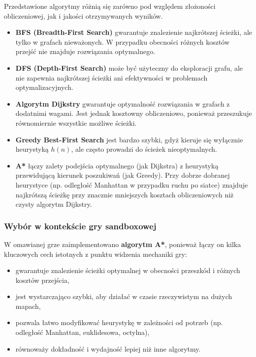\documentclass[a4paper,12pt]{book} %
\begin{document}
Przedstawione algorytmy różnią się zarówno pod względem złożoności obliczeniowej, 
jak i jakości otrzymywanych wyników. 
\begin{itemize}
    \item \textbf{BFS (Breadth-First Search)} gwarantuje znalezienie najkrótszej ścieżki, 
    ale tylko w grafach nieważonych. W przypadku obecności różnych kosztów przejść nie znajduje rozwiązania optymalnego.
    
    \item \textbf{DFS (Depth-First Search)} może być użyteczny do eksploracji grafu, 
    ale nie zapewnia najkrótszej ścieżki ani efektywności w problemach optymalizacyjnych.
    
    \item \textbf{Algorytm Dijkstry} gwarantuje optymalność rozwiązania w grafach z dodatnimi wagami. 
    Jest jednak kosztowny obliczeniowo, ponieważ przeszukuje równomiernie wszystkie możliwe ścieżki.
    
    \item \textbf{Greedy Best-First Search} jest bardzo szybki, 
    gdyż kieruje się wyłącznie heurystyką \(h(n)\), 
    ale często prowadzi do ścieżek nieoptymalnych.
    
    \item \textbf{A*} łączy zalety podejścia optymalnego (jak Dijkstra) z heurystyką przewidującą kierunek poszukiwań (jak Greedy). 
    Przy dobrze dobranej heurystyce (np. odległość Manhattan w przypadku ruchu po siatce) 
    znajduje najkrótszą ścieżkę przy znacznie mniejszych kosztach obliczeniowych niż czysty algorytm Dijkstry.
\end{itemize}

\subsubsection*{Wybór w kontekście gry sandboxowej}

W omawianej grze zaimplementowano \textbf{algorytm A*}, 
ponieważ łączy on kilka kluczowych cech istotnych z punktu widzenia mechaniki gry:
\begin{itemize}
    \item gwarantuje znalezienie ścieżki optymalnej w obecności przeszkód i różnych kosztów przejścia,
    \item jest wystarczająco szybki, aby działać w czasie rzeczywistym na dużych mapach,
    \item pozwala łatwo modyfikować heurystykę w zależności od potrzeb (np. odległość Manhattan, euklidesowa, octylna),
    \item równoważy dokładność i wydajność lepiej niż inne algorytmy.
\end{itemize}
\end{document}
